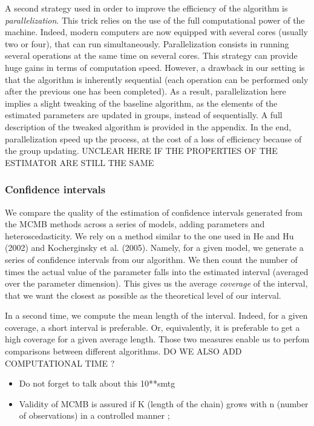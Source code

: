 \documentclass[11pt]{article}
\begin{document}
A second strategy used in order to improve the efficiency of the algorithm is \textit{parallelization}. This trick relies on the use of the full computational power of the machine. Indeed, modern computers are now equipped with several cores (usually two or four), that can run simultaneously. Parallelization consists in running several operations at the same time on several cores. This strategy can provide huge gains in terms of computation speed. However, a drawback in our setting is that the algorithm is inherently sequential (each operation can be performed only after the previous one has been completed). As a result, parallelization here implies a slight tweaking of the baseline algorithm, as the elements of the estimated parameters are updated in groups, instead of sequentially. A full description of the tweaked algorithm is provided in the appendix. In the end, parallelization speed up the process, at the cost of a loss of efficiency because of the group updating. UNCLEAR HERE IF THE PROPERTIES OF THE ESTIMATOR ARE STILL THE SAME\smallskip


	\subsubsection{Confidence intervals}
	
	We compare the quality of the estimation of confidence intervals generated from the MCMB methods across a series of models, adding parameters and heteroscedasticity. We rely on a method similar to the one used in He and Hu (2002) and Kocherginsky et al. (2005). Namely, for a given model, we generate a series of confidence intervals from our algorithm. We then count the number of times the actual value of the parameter falls into the estimated interval (averaged over the parameter dimension). This gives us the average \textit{coverage} of the interval, that we want the closest as possible as the theoretical level of our interval.\smallskip
	
	In a second time, we compute the mean length of the interval. Indeed, for a given coverage, a short interval is preferable. Or, equivalently, it is preferable to get a high coverage for a given average length. Those two measures enable us to perfom comparisons between different algorithms. DO WE ALSO ADD COMPUTATIONAL TIME ?\smallskip

	
\begin{itemize}
\item Do not forget to talk about this 10**smtg
\item Validity of MCMB is assured if K (length of the chain) grows with n (number of observations) in a controlled manner ;
\end{itemize}
\end{document}
